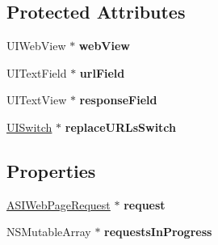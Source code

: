 \subsection*{\-Protected \-Attributes}
\begin{DoxyCompactItemize}
\item 
\hypertarget{interface_web_page_view_controller_a0658683587de002bc7c1cbaa68bcc2df}{
\-U\-I\-Web\-View $\ast$ {\bfseries web\-View}}
\label{interface_web_page_view_controller_a0658683587de002bc7c1cbaa68bcc2df}

\item 
\hypertarget{interface_web_page_view_controller_a4b5662e8e66a3d74e751853c9ec5de95}{
\-U\-I\-Text\-Field $\ast$ {\bfseries url\-Field}}
\label{interface_web_page_view_controller_a4b5662e8e66a3d74e751853c9ec5de95}

\item 
\hypertarget{interface_web_page_view_controller_af8b5c6822003f7e8645d6adf89a97d55}{
\-U\-I\-Text\-View $\ast$ {\bfseries response\-Field}}
\label{interface_web_page_view_controller_af8b5c6822003f7e8645d6adf89a97d55}

\item 
\hypertarget{interface_web_page_view_controller_a884d3902cbcdd25816fd7eb4be9d1e71}{
\hyperlink{class_u_i_switch}{\-U\-I\-Switch} $\ast$ {\bfseries replace\-U\-R\-Ls\-Switch}}
\label{interface_web_page_view_controller_a884d3902cbcdd25816fd7eb4be9d1e71}

\end{DoxyCompactItemize}
\subsection*{\-Properties}
\begin{DoxyCompactItemize}
\item 
\hypertarget{interface_web_page_view_controller_aa56b5a8938ac2fec648467c88677a1c6}{
\hyperlink{interface_a_s_i_web_page_request}{\-A\-S\-I\-Web\-Page\-Request} $\ast$ {\bfseries request}}
\label{interface_web_page_view_controller_aa56b5a8938ac2fec648467c88677a1c6}

\item 
\hypertarget{interface_web_page_view_controller_ade6d2176db589b7d0198aa6ae809a69e}{
\-N\-S\-Mutable\-Array $\ast$ {\bfseries requests\-In\-Progress}}
\label{interface_web_page_view_controller_ade6d2176db589b7d0198aa6ae809a69e}

\end{DoxyCompactItemize}


